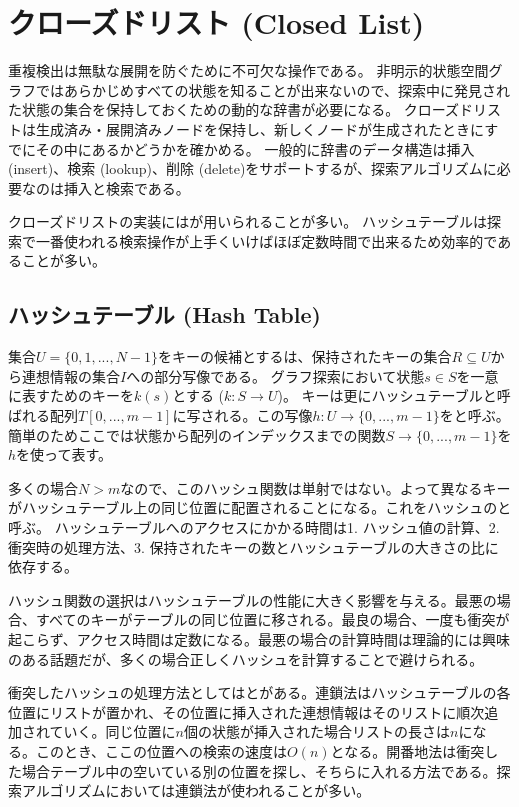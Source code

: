 \section{クローズドリスト (Closed List)}
\label{sec:closed-list}

重複検出は無駄な展開を防ぐために不可欠な操作である。
非明示的状態空間グラフではあらかじめすべての状態を知ることが出来ないので、探索中に発見された状態の集合を保持しておくための動的な辞書が必要になる。
クローズドリストは生成済み・展開済みノードを保持し、新しくノードが生成されたときにすでにその中にあるかどうかを確かめる。
一般的に辞書のデータ構造は挿入 (insert)、検索 (lookup)、削除 (delete)をサポートするが、探索アルゴリズムに必要なのは挿入と検索である。

クローズドリストの実装にはが用いられることが多い。
ハッシュテーブルは探索で一番使われる検索操作が上手くいけばほぼ定数時間で出来るため効率的であることが多い。


\subsection{ハッシュテーブル (Hash Table)}
\label{sec:hash-table}

集合$U = \{0, 1, ..., N - 1\}$をキーの候補とするは、保持されたキーの集合$R \subseteq U$から連想情報の集合$I$への部分写像である。
グラフ探索において状態$s \in S$を一意に表すためのキーを$k(s)$とする ($k: S \rightarrow U$)。
キーは更にハッシュテーブルと呼ばれる配列$T[0, ..., m-1]$に写される。この写像$h: U \rightarrow \{0, ..., m-1\}$をと呼ぶ。簡単のためここでは状態から配列のインデックスまでの関数$S \rightarrow \{0, ..., m-1\}$を$h$を使って表す。

多くの場合$N > m$なので、このハッシュ関数は単射ではない。よって異なるキーがハッシュテーブル上の同じ位置に配置されることになる。これをハッシュのと呼ぶ。
ハッシュテーブルへのアクセスにかかる時間は1. ハッシュ値の計算、2. 衝突時の処理方法、3. 保持されたキーの数とハッシュテーブルの大きさの比に依存する。

ハッシュ関数の選択はハッシュテーブルの性能に大きく影響を与える。最悪の場合、すべてのキーがテーブルの同じ位置に移される。最良の場合、一度も衝突が起こらず、アクセス時間は定数になる。最悪の場合の計算時間は理論的には興味のある話題だが、多くの場合正しくハッシュを計算することで避けられる。

衝突したハッシュの処理方法としてはとがある。連鎖法はハッシュテーブルの各位置にリストが置かれ、その位置に挿入された連想情報はそのリストに順次追加されていく。同じ位置に$n$個の状態が挿入された場合リストの長さは$n$になる。このとき、ここの位置への検索の速度は$O(n)$となる。開番地法は衝突した場合テーブル中の空いている別の位置を探し、そちらに入れる方法である。探索アルゴリズムにおいては連鎖法が使われることが多い。


